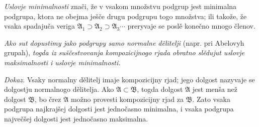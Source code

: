 \documentclass[11pt]{article}
\providecommand{\mA}{\mathfrak{A}}
\providecommand{\mB}{\mathfrak{B}}
\begin{document}
\emph{Uslovje minimalnosti} znači, že v vsakom množstvu podgrup jest minimalna podgrupa, ktora ne obejma ješče drugu podgrupu togo množstva; ili takože, že vsaka spadajuča veriga $\mA_1\supset\mA_2\supset\mA_3\cdots$ preryvaje se poslě konečno mnogo členov.

\emph{Ako sut dopustimy jako podgrupy samo normalne dělitelji} (napr. pri Abelovyh grupah), \emph{togda iz suščestvovanja kompozicijnogo rjada obratno slědujut uslovje maksimalnosti i uslovje minimalnosti.}

\emph{Dokaz.} Vsaky normalny dělitelj imaje kompozicijny rjad; jego dolgost nazyvaje se dolgostju normalnogo dělitelja. Ako $\mA\subset\mB$, togda dolgost $\mA$ jest menša než dolgost $\mB$, bo črez $\mA$ možno provesti kompozicijny rjad za $\mB$. Zato vsaka podgrupa najkrajšej dolgosti jest jednočasno minimalna, i vsaka podgrupa največšej dolgosti jest jednočasno maksimalna.
\end{document}
